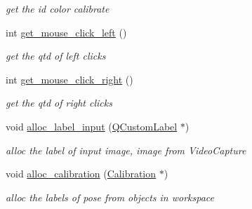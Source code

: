 \begin{DoxyCompactItemize}
\begin{DoxyCompactList}\small\item\em get the id color calibrate \end{DoxyCompactList}\item 
\hypertarget{classcalibration_a45d0e76b3f360c7b198166cf7ccc638d}{int \hyperlink{classcalibration_a45d0e76b3f360c7b198166cf7ccc638d}{get\-\_\-mouse\-\_\-click\-\_\-left} ()}\label{classcalibration_a45d0e76b3f360c7b198166cf7ccc638d}

\begin{DoxyCompactList}\small\item\em get the qtd of left clicks \end{DoxyCompactList}\item 
\hypertarget{classcalibration_a8053c43e483faf127e20e16ff4ee6d8a}{int \hyperlink{classcalibration_a8053c43e483faf127e20e16ff4ee6d8a}{get\-\_\-mouse\-\_\-click\-\_\-right} ()}\label{classcalibration_a8053c43e483faf127e20e16ff4ee6d8a}

\begin{DoxyCompactList}\small\item\em get the qtd of right clicks \end{DoxyCompactList}\item 
void \hyperlink{classcalibration_ab0b5f5514c665852aa63830121622518}{alloc\-\_\-label\-\_\-input} (\hyperlink{classQCustomLabel}{Q\-Custom\-Label} $\ast$)
\begin{DoxyCompactList}\small\item\em alloc the label of input image, image from Video\-Capture \end{DoxyCompactList}\item 
void \hyperlink{classcalibration_ac5e4cd1cead7176b0f34586112aaa918}{alloc\-\_\-calibration} (\hyperlink{structcommon_1_1Calibration}{Calibration} $\ast$)
\begin{DoxyCompactList}\small\item\em alloc the labels of pose from objects in workspace \end{DoxyCompactList}\end{DoxyCompactItemize}
